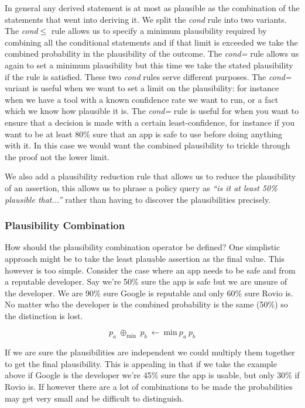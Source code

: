 \documentclass[thesis.tex]{subfiles}
\begin{document}
In general any derived statement is at most as plausible as the
combination of the statements that went into deriving it.  We split
the \emph{cond} rule into two variants.  The \emph{cond$\leq$} rule
allows us to specify a minimum plausibility required by combining all
the conditional statements and if that limit is exceeded we take the
combined probability in the plausibility of the outcome.  The
\emph{cond=} rule allows us again to set a minimum plausibility but
this time we take the stated plausibility if the rule is satisfied.
These two \emph{cond} rules serve different purposes.  The
\emph{cond=} variant is useful when we want to set a limit on the
plausibility: for instance when we have a tool with a known confidence
rate we want to run, or a fact which we know how plausible it is.  The
\emph{cond=} rule is useful for when you want to ensure that a
decision is made with a certain least-confidence, for instance if you
want to be at least 80\% sure that an app is safe to use before doing
anything with it.  In this case we would want the combined
plausibility to trickle through the proof not the lower limit.

We also add a plausibility reduction rule that allows us to reduce the
plausibility of an assertion, this allows us to phrase a policy query
as \emph{``is it at least 50\% plausible that...''} rather than having
to discover the plausibilities precisely.

\subsubsection{Plausibility Combination}

How should the plausibility combination operator be defined?  One
simplistic approach might be to take the least plauable assertion as
the final value.  This however is too simple. Consider the case where
an app needs to be safe and from a reputable developer.  Say we're
50\% sure the app is safe but we are unsure of the developer. We are
90\% sure Google is reputable and only 60\% sure Rovio is.  No matter
who the developer is the combined probability is the same (50\%) so
the distinction is lost.

\begin{equation*}
  p_a~\oplus_{\text{min}}~p_b~\gets~\text{min}~p_a~p_b
\end{equation*}

If we are sure the plausibilities are independent we could multiply
them together to get the final plausibility. This is appealing in that
if we take the example above if Google is the developer we're 45\%
sure the app is usable, but only 30\% if Rovio is.  If however there
are a lot of combinations to be made the probabilities may get very
small and be difficult to distinguish.
\end{document}
